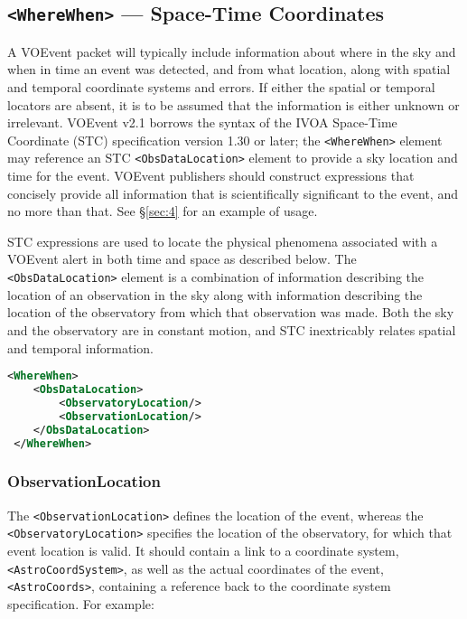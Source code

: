 \documentclass[11pt,a4paper]{ivoa}
\begin{document}
\subsection{{\tt <WhereWhen>} --- Space-Time Coordinates}
\label{sec:3.4}

A VOEvent packet will typically include information about where in the sky and 
when in time an event was detected, and from what location, along with spatial 
and temporal coordinate systems and errors. If either the spatial or temporal 
locators are absent, it is to be assumed that the information is either unknown 
or irrelevant. VOEvent v2.1 borrows the syntax of the IVOA Space-Time Coordinate 
(STC) specification version 1.30 or later; the {\tt <WhereWhen>} element may 
reference an STC \citep{2007ivoa.spec.1030R} {\tt <ObsDataLocation>} element to 
provide a sky location and time for the event. VOEvent publishers should 
construct expressions that concisely provide all information that is 
scientifically significant to the event, and no more than that. See 
\S\ref{sec:4} for an example of usage. 

STC expressions are used to locate the physical phenomena associated with a 
VOEvent alert in both time and space as described below. The {\tt 
<ObsDataLocation>} element is a combination of information describing the 
location of an observation in the sky along with information describing the 
location of the observatory from which that observation was made. Both the sky 
and the observatory are in constant motion, and STC inextricably relates spatial 
and temporal information. 

\begin{lstlisting}[language=XML]
<WhereWhen>
    <ObsDataLocation>
        <ObservatoryLocation/>
        <ObservationLocation/>
    </ObsDataLocation>
 </WhereWhen>
\end{lstlisting}

\subsubsection{ObservationLocation}
\label{sec:3.4.1}

The {\tt <ObservationLocation>} defines the location of the event, whereas
the {\tt <ObservatoryLocation>} specifies the location of the observatory,
for which that event location is valid. It should contain a link to a
coordinate system, {\tt <AstroCoordSystem>}, as well as the actual coordinates
of the event, {\tt <AstroCoords>}, containing a reference back to the
coordinate system specification. For example:
\end{document}
